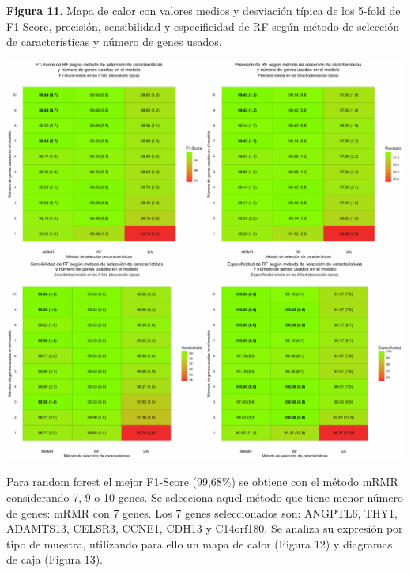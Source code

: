 \begin{center}
\textbf{Figura 11}. Mapa de calor con valores medios y desviación típica de los 5-fold de F1-Score, precisión, sensibilidad y especificidad de RF según método de selección de características y número de genes usados.
\end{center}
\begin{center}
	\includegraphics[width=1\textwidth]{figuras/11_higado_biclase_heatmap_rf.pdf} 
\end{center}

Para random forest el mejor F1-Score (99,68\%) se obtiene con el método mRMR considerando 7, 9 o 10 genes. Se selecciona aquel método que tiene menor número de genes: mRMR con 7 genes. Los 7 genes seleccionados son: ANGPTL6, THY1, ADAMTS13, CELSR3, CCNE1, CDH13 y C14orf180. Se analiza su expresión por tipo de muestra, utilizando para ello un mapa de calor (Figura 12) y diagramas de caja (Figura 13).\\

